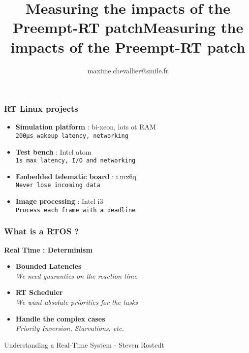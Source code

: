 \documentclass{smilebeamer}
\title{Measuring the impacts of the Preempt-RT patch}
\author{maxime.chevallier@smile.fr}
\begin{document}
\begin{frame}[plain]
	\title{Measuring the impacts of the Preempt-RT patch}
    \titlepage
\end{frame}

\begin{frame}
	\frametitle{RT Linux projects}
		\begin{itemize}
			\item \textbf{Simulation platform} : bi-xeon, lots ot RAM \\ \small{\texttt{200µs wakeup latency, networking}}
			\vspace{0.3cm}
			\item \textbf{Test bench} : Intel atom \\ \small{\texttt{1s max latency, I/O and networking}}
			\vspace{0.3cm}
			\item \textbf{Embedded telematic board} : i.mx6q \\ \small{\texttt{Never lose incoming data}}
			\vspace{0.3cm}
			\item \textbf{Image processing} : Intel i3 \\ \small{\texttt{Process each frame with a deadline}}
		\end{itemize}
\end{frame}

\begin{frame}
	\frametitle{What is a RTOS ?}

	\textbf{Real Time : Determinism}

	\begin{itemize}
		\item \textbf{Bounded Latencies} \\ \small{\textit{We need guaranties on the reaction time}}
			\vspace{0.3cm}
		\item \textbf{RT Scheduler} \\ \small{\textit{We want absolute priorities for the tasks}}
			\vspace{0.3cm}
		\item \textbf{Handle the complex cases} \\ \small{\textit{Priority Inversion, Starvations, etc.}}
	\end{itemize}

	{\small{Understanding a Real-Time System - Steven Rostedt}}

\end{frame}
\end{document}
